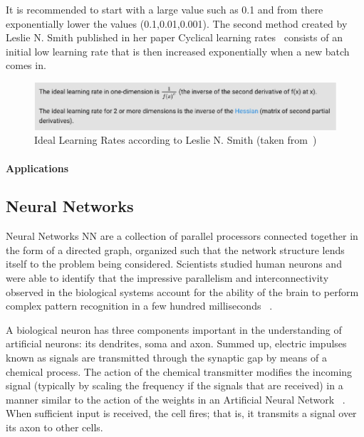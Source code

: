 It is recommended to start with a large value such as 0.1 and from there exponentially lower the values (0.1,0.01,0.001).
The second method created by Leslie N. Smith published in her paper Cyclical learning rates~\cite{leslie15} consists of an initial low learning rate that is then increased exponentially when a new batch comes in.

\begin{figure}[htbp]
  \centering
  \includegraphics[width=\textwidth]{images/learningRate}
  \caption{ Ideal Learning Rates according to Leslie N. Smith (taken from~\cite{leslie15}) }
  \label{fig:learningRate}
\end{figure}


\paragraph{Applications}



\subsection{Neural Networks}

Neural Networks \ac{NN}  are a collection of parallel processors connected together in the form of a directed graph, organized such that the network structure lends itself to the problem being considered. Scientists studied human neurons and were able to identify that the impressive parallelism and interconnectivity observed in the biological systems account for the ability of the brain to perform complex pattern recognition in a few hundred milliseconds ~\cite{freeman91}.

A biological neuron has three components important in the understanding of artificial neurons: its dendrites, soma and axon. Summed up, electric impulses known as signals are transmitted through the synaptic gap by means of a chemical process. The action of the chemical transmitter modifies the incoming signal (typically by scaling the frequency if the signals that are received) in a manner similar to the action of the weights in an Artificial Neural Network ~\cite{fausett93}. When sufficient input is received, the cell fires; that is, it transmits a signal over its axon to other cells. 

